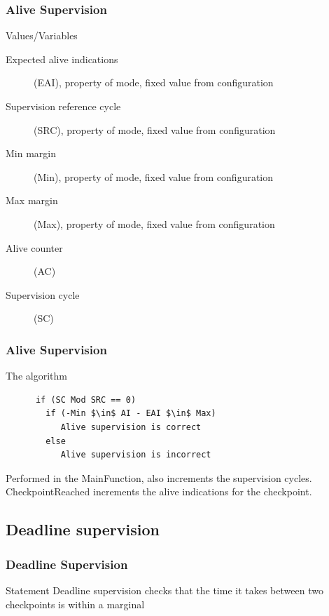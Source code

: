 \documentclass{beamer}
\begin{document}
\begin{frame}
  \frametitle{Alive Supervision}
  \begin{block}{Values/Variables}
    \begin{description}
      \item[Expected alive indications] (EAI), property of mode, fixed
        value from configuration
      \item[Supervision reference cycle] (SRC), property of mode, fixed value
        from configuration
      \item[Min margin] (Min), property of mode, fixed value from configuration
      \item[Max margin] (Max), property of mode, fixed value from configuration
      \item[Alive counter] (AC)
      \item[Supervision cycle] (SC)
    \end{description}
  \end{block}
\end{frame}

\begin{frame}[fragile]
  \frametitle{Alive Supervision}
  \begin{block}{The algorithm}
    \begin{lstlisting}
      if (SC Mod SRC == 0)
        if (-Min $\in$ AI - EAI $\in$ Max)
           Alive supervision is correct
        else
           Alive supervision is incorrect
    \end{lstlisting}
  \end{block}
  Performed in the MainFunction, also increments the supervision
  cycles.\\
  CheckpointReached increments the alive indications for the
  checkpoint.
\end{frame}

\subsection{Deadline supervision}
\begin{frame}
  \frametitle{Deadline Supervision}
  \begin{block}{Statement}
    Deadline supervision checks that the time it takes between two
    checkpoints is within a marginal
  \end{block}
\end{frame}
\end{document}

